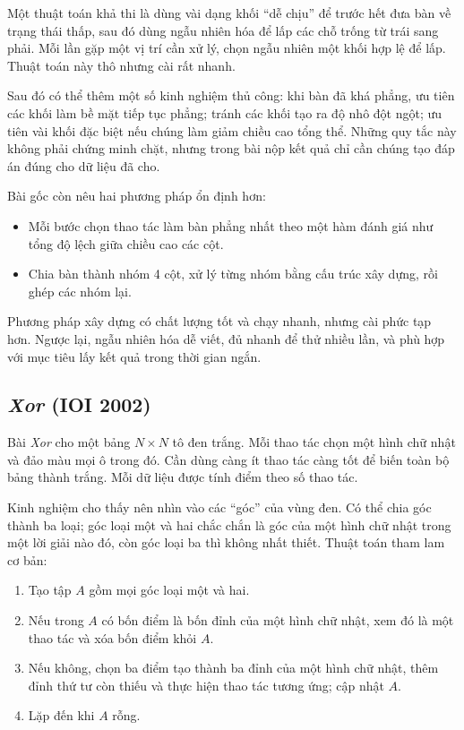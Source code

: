 \documentclass[11pt]{article}
\begin{document}
Một thuật toán khả thi là dùng vài dạng khối ``dễ chịu'' để trước hết đưa bàn
về trạng thái thấp, sau đó dùng ngẫu nhiên hóa để lấp các chỗ trống từ trái
sang phải. Mỗi lần gặp một vị trí cần xử lý, chọn ngẫu nhiên một khối hợp lệ
để lấp. Thuật toán này thô nhưng cài rất nhanh.

Sau đó có thể thêm một số kinh nghiệm thủ công: khi bàn đã khá phẳng, ưu tiên
các khối làm bề mặt tiếp tục phẳng; tránh các khối tạo ra độ nhô đột ngột; ưu
tiên vài khối đặc biệt nếu chúng làm giảm chiều cao tổng thể. Những quy tắc
này không phải chứng minh chặt, nhưng trong bài nộp kết quả chỉ cần chúng tạo
đáp án đúng cho dữ liệu đã cho.

Bài gốc còn nêu hai phương pháp ổn định hơn:

\begin{itemize}
  \item Mỗi bước chọn thao tác làm bàn phẳng nhất theo một hàm đánh giá như
  tổng độ lệch giữa chiều cao các cột.
  \item Chia bàn thành nhóm 4 cột, xử lý từng nhóm bằng cấu trúc xây dựng,
  rồi ghép các nhóm lại.
\end{itemize}

Phương pháp xây dựng có chất lượng tốt và chạy nhanh, nhưng cài phức tạp hơn.
Ngược lại, ngẫu nhiên hóa dễ viết, đủ nhanh để thử nhiều lần, và phù hợp với
mục tiêu lấy kết quả trong thời gian ngắn.

\subsection{\textit{Xor} (IOI 2002)}

Bài \textit{Xor} cho một bảng \(N\times N\) tô đen trắng. Mỗi thao tác chọn
một hình chữ nhật và đảo màu mọi ô trong đó. Cần dùng càng ít thao tác càng
tốt để biến toàn bộ bảng thành trắng. Mỗi dữ liệu được tính điểm theo số thao
tác.

Kinh nghiệm cho thấy nên nhìn vào các ``góc'' của vùng đen. Có thể chia góc
thành ba loại; góc loại một và hai chắc chắn là góc của một hình chữ nhật
trong một lời giải nào đó, còn góc loại ba thì không nhất thiết. Thuật toán
tham lam cơ bản:

\begin{enumerate}
  \item Tạo tập \(A\) gồm mọi góc loại một và hai.
  \item Nếu trong \(A\) có bốn điểm là bốn đỉnh của một hình chữ nhật, xem đó
  là một thao tác và xóa bốn điểm khỏi \(A\).
  \item Nếu không, chọn ba điểm tạo thành ba đỉnh của một hình chữ nhật, thêm
  đỉnh thứ tư còn thiếu và thực hiện thao tác tương ứng; cập nhật \(A\).
  \item Lặp đến khi \(A\) rỗng.
\end{enumerate}
\end{document}
